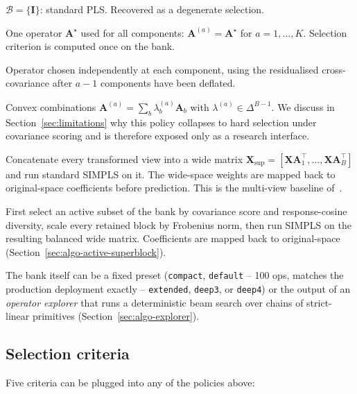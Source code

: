 \documentclass[review,a4paper]{elsarticle}
\newcommand{\identity}{\mathbf{I}}
\newcommand{\Xmat}{\mathbf{X}}
\newcommand{\Amat}{\mathbf{A}}
\newcommand{\AOM}{\textsc{AOM}\xspace}
\newcommand{\POP}{\textsc{POP}\xspace}
\newcommand{\PLS}{\textsc{PLS}\xspace}
\newcommand{\SIMPLS}{\textsc{SIMPLS}\xspace}
\begin{document}
\begin{description}[leftmargin=2em]
  \item[\textsc{none}.] $\mathcal{B}=\{\identity\}$: standard
  \PLS. Recovered as a degenerate selection.
  \item[\textsc{global} (\AOM).] One operator $\Amat^\star$ used for all
  components: $\Amat^{(a)}=\Amat^\star$ for $a=1,\dots,K$.
  Selection criterion is computed once on the bank.
  \item[\textsc{per\_component} (\POP).] Operator chosen independently at
  each component, using the residualised cross-covariance after
  $a-1$ components have been deflated.
  \item[\textsc{soft} (experimental).] Convex combinations
  $\Amat^{(a)}=\sum_b \lambda_b^{(a)} \Amat_b$ with $\lambda^{(a)}\in
  \Delta^{B-1}$. We discuss in Section~\ref{sec:limitations} why this
  policy collapses to hard selection under covariance scoring and
  is therefore exposed only as a research interface.
  \item[\textsc{superblock}.] Concatenate every transformed view into a
  wide matrix $\Xmat_{\mathrm{sup}}=[\Xmat\Amat_1^\top,\dots,
  \Xmat\Amat_B^\top]$ and run standard \SIMPLS on it. The wide-space
  weights are mapped back to original-space coefficients before
  prediction. This is the multi-view baseline
  of~\cite{westerhuis1998analysis}.
  \item[\textsc{active\_superblock}.] First select an active subset of
  the bank by covariance score and response-cosine diversity, scale
  every retained block by Frobenius norm, then run \SIMPLS on the
  resulting balanced wide matrix. Coefficients are mapped back to
  original-space (Section~\ref{sec:algo-active-superblock}).
\end{description}

The bank itself can be a fixed preset (\texttt{compact},
\texttt{default} -- 100 ops, matches the production deployment exactly --
\texttt{extended}, \texttt{deep3}, or \texttt{deep4}) or the output of an
\emph{operator explorer} that runs a deterministic beam search over
chains of strict-linear primitives (Section~\ref{sec:algo-explorer}).

\subsection{Selection criteria}
Five criteria can be plugged into any of the policies above:
\end{document}
